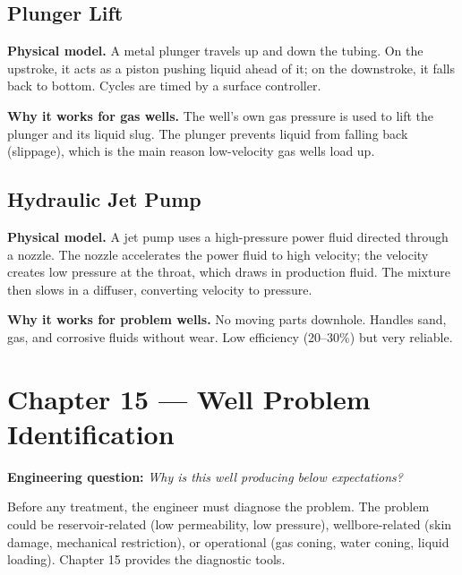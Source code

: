 \documentclass[11pt,a4paper,openany]{book}
\begin{document}
\section{Plunger Lift}

\begin{theory}
\textbf{Physical model.} A metal plunger travels up and down the
tubing. On the upstroke, it acts as a piston pushing liquid ahead of
it; on the downstroke, it falls back to bottom. Cycles are timed by a
surface controller.

\textbf{Why it works for gas wells.} The well's own gas pressure is
used to lift the plunger and its liquid slug. The plunger prevents
liquid from falling back (slippage), which is the main reason
low-velocity gas wells load up.
\end{theory}

\section{Hydraulic Jet Pump}

\begin{theory}
\textbf{Physical model.} A jet pump uses a high-pressure power fluid
directed through a nozzle. The nozzle accelerates the power fluid to
high velocity; the velocity creates low pressure at the throat,
which draws in production fluid. The mixture then slows in a diffuser,
converting velocity to pressure.

\textbf{Why it works for problem wells.} No moving parts downhole.
Handles sand, gas, and corrosive fluids without wear. Low efficiency
(20--30\%) but very reliable.
\end{theory}

\chapter{Chapter 15 — Well Problem Identification}

\begin{purpose}
\textbf{Engineering question:} \emph{Why is this well producing below
expectations?}

Before any treatment, the engineer must diagnose the problem. The
problem could be reservoir-related (low permeability, low pressure),
wellbore-related (skin damage, mechanical restriction), or
operational (gas coning, water coning, liquid loading). Chapter 15
provides the diagnostic tools.
\end{purpose}
\end{document}

